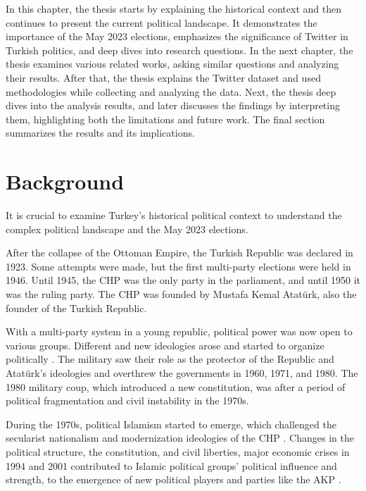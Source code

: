 In this chapter, the thesis starts by explaining the historical context and then continues 
to present the current political landscape. It demonstrates the importance of the May 2023 elections, 
emphasizes the significance of Twitter in Turkish politics, and deep dives into research questions. 
In the next chapter, the thesis examines various related works, asking similar questions and 
analyzing their results. After that, the thesis explains the Twitter dataset and used methodologies 
while collecting and analyzing the data. Next, the thesis deep dives into the analysis results, 
and later discusses the findings by interpreting them, highlighting both the limitations and future work. 
The final section summarizes the results and its implications.
\section{Background}

It is crucial to examine Turkey's historical political context to understand 
the complex political landscape and the May 2023 elections.

After the collapse of the Ottoman Empire, the Turkish Republic was declared in 1923.
Some attempts were made, but the first multi-party elections were held in 1946. 
Until 1945, the \ac{CHP} was the only party in the parliament, and until 1950 it was the ruling party.
The \ac{CHP} was founded by Mustafa Kemal Atatürk, also the founder of the Turkish Republic.

With a multi-party system in a young republic, political power was now open to various groups.
Different and new ideologies arose and started to organize politically \parencite{rise_of_islam_turkey}.
The military saw their role as the protector of the Republic and Atatürk's ideologies 
and overthrew the governments in 1960, 1971, and 1980.
The 1980 military coup, which introduced a new constitution, was after a period of
political fragmentation and civil instability in the 1970s. 

During the 1970s, political Islamism started to emerge, which challenged 
the secularist nationalism and modernization ideologies of the \ac{CHP} \parencite{erdoganism_akp_after_15_years}. 
Changes in the political structure, the constitution, and civil liberties, major economic crises in 1994 and 2001 \parencite{financial_crisis_turkey_1994}
contributed to Islamic political groups' political influence and strength, 
to the emergence of new political players and parties like the \ac{AKP} \parencite{rise_of_islam_turkey}.

